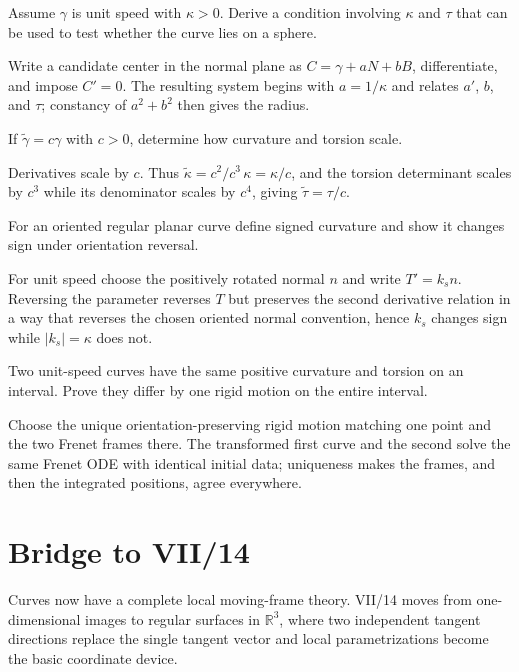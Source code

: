 \begin{problem}\label{prob:vii13-ch02}
Assume \(\gamma\) is unit speed with \(\kappa>0\). Derive a condition involving \(\kappa\) and \(\tau\) that can be used to test whether the curve lies on a sphere.
\end{problem}
\begin{solution}
Write a candidate center in the normal plane as \(C=\gamma+aN+bB\), differentiate, and impose \(C'=0\). The resulting system begins with \(a=1/\kappa\) and relates \(a'\), \(b\), and \(\tau\); constancy of \(a^2+b^2\) then gives the radius.
\end{solution}

\begin{problem}\label{prob:vii13-ch03}
If \(\widetilde\gamma=c\gamma\) with \(c>0\), determine how curvature and torsion scale.
\end{problem}
\begin{solution}
Derivatives scale by \(c\). Thus \(\widetilde\kappa=c^2/c^3\,\kappa=\kappa/c\), and the torsion determinant scales by \(c^3\) while its denominator scales by \(c^4\), giving \(\widetilde\tau=\tau/c\).
\end{solution}

\begin{problem}\label{prob:vii13-ch04}
For an oriented regular planar curve define signed curvature and show it changes sign under orientation reversal.
\end{problem}
\begin{solution}
For unit speed choose the positively rotated normal \(n\) and write \(T'=k_s n\). Reversing the parameter reverses \(T\) but preserves the second derivative relation in a way that reverses the chosen oriented normal convention, hence \(k_s\) changes sign while \(|k_s|=\kappa\) does not.
\end{solution}

\begin{problem}\label{prob:vii13-ch05}
Two unit-speed curves have the same positive curvature and torsion on an interval. Prove they differ by one rigid motion on the entire interval.
\end{problem}
\begin{solution}
Choose the unique orientation-preserving rigid motion matching one point and the two Frenet frames there. The transformed first curve and the second solve the same Frenet ODE with identical initial data; uniqueness makes the frames, and then the integrated positions, agree everywhere.
\end{solution}

\section*{Bridge to VII/14}
Curves now have a complete local moving-frame theory.  VII/14 moves from one-dimensional images to regular surfaces in \(\mathbb R^3\), where two independent tangent directions replace the single tangent vector and local parametrizations become the basic coordinate device.
